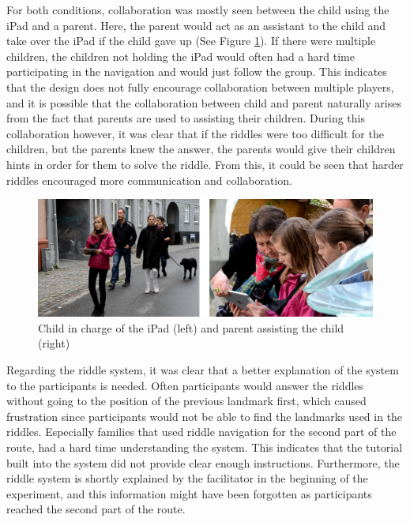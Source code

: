 For both conditions, collaboration was mostly seen between the child using the iPad and a parent. Here, the parent would act as an assistant to the child and take over the iPad if the child gave up (See Figure \ref{Communication2}). If there were multiple children, the children not holding the iPad would often had a hard time participating in the navigation and would just follow the group. This indicates that the design does not fully encourage collaboration between multiple players, and it is possible that the collaboration between child and parent naturally arises from the fact that parents are used to assisting their children. During this collaboration however, it was clear that if the riddles were too difficult for the children, but the parents knew the answer, the parents would give their children hints in order for them to solve the riddle. From this, it could be seen that harder riddles encouraged more communication and collaboration.

\begin{figure}[hbtp]
\centering
\includegraphics[scale=0.13]{Pics/exp2.png}
\caption{Child in charge of the iPad (left) and parent assisting the child (right)}
\label{Communication2}
\end{figure}

Regarding the riddle system, it was clear that a better explanation of the system to the participants is needed. Often participants would answer the riddles without going to the position of the previous landmark first, which caused frustration since participants would not be able to find the landmarks used in the riddles. Especially families that used riddle navigation for the second part of the route, had a hard time understanding the system. This indicates that the tutorial built into the system did not provide clear enough instructions. Furthermore, the riddle system is shortly explained by the facilitator in the beginning of the experiment, and this information might have been forgotten as participants reached the second part of the route. 


